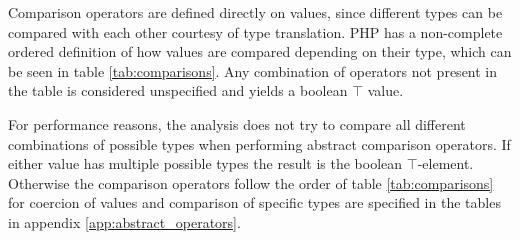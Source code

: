 \begin{table}[htbp]
\centering
{}
\caption{Abstract modulus}
\label{tab:abstract_modulus1}
\end{table}

Comparison operators are defined directly on values, since different types can be compared with each other courtesy of type translation. PHP has a non-complete ordered definition of how values are compared depending on their type, which can be seen in table \ref{tab:comparisons}. Any combination of operators not present in the table is considered unspecified and yields a boolean $\top$ value. 

For performance reasons, the analysis does not try to compare all different combinations of possible types when performing abstract comparison operators. If either value has multiple possible types the result is the boolean $\top$-element. Otherwise the comparison operators follow the order of table \ref{tab:comparisons} for coercion of values and comparison of specific types are specified in the tables in appendix \ref{app:abstract_operators}.

